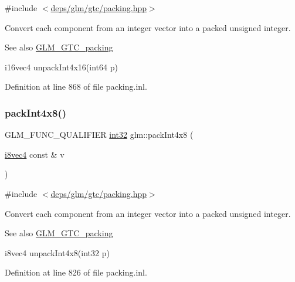 {\ttfamily \#include $<$\hyperlink{gtc_2packing_8hpp}{deps/glm/gtc/packing.\+hpp}$>$}

Convert each component from an integer vector into a packed unsigned integer.

\begin{DoxySeeAlso}{See also}
\hyperlink{group__gtc__packing}{G\+L\+M\+\_\+\+G\+T\+C\+\_\+packing} 

i16vec4 unpack\+Int4x16(int64 p) 
\end{DoxySeeAlso}


Definition at line 868 of file packing.\+inl.

\mbox{\label{group__gtc__packing_gac04277b39f9ca1ae2ca4840a3cb987e8}} 
\subsubsection{\texorpdfstring{pack\+Int4x8()}{packInt4x8()}}
{\footnotesize\ttfamily G\+L\+M\+\_\+\+F\+U\+N\+C\+\_\+\+Q\+U\+A\+L\+I\+F\+I\+ER \hyperlink{group__gtc__type__precision_ga632d8b25f6b61659f39ea4321fab92a4}{int32} glm\+::pack\+Int4x8 (\begin{DoxyParamCaption}\item[{\hyperlink{group__gtc__type__precision_gaaad99cfb998ddcb74e9c33d0149fdd0e}{i8vec4} const \&}]{v }\end{DoxyParamCaption})}



{\ttfamily \#include $<$\hyperlink{gtc_2packing_8hpp}{deps/glm/gtc/packing.\+hpp}$>$}

Convert each component from an integer vector into a packed unsigned integer.

\begin{DoxySeeAlso}{See also}
\hyperlink{group__gtc__packing}{G\+L\+M\+\_\+\+G\+T\+C\+\_\+packing} 

i8vec4 unpack\+Int4x8(int32 p) 
\end{DoxySeeAlso}


Definition at line 826 of file packing.\+inl.

\mbox{\label{group__gtc__packing_ga0466daf4c90f76cc64b3f105ce727295}} 
